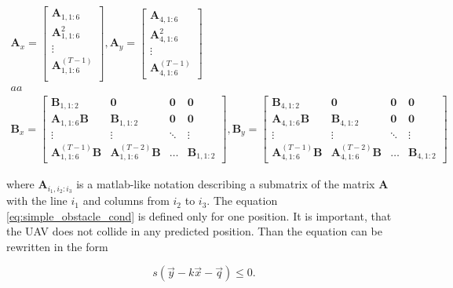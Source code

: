 \documentclass{article}
\begin{document}
\begin{equation}
\begin{split}
\textbf{A}_x = 
\begin{bmatrix}
\textbf{A}_{1, 1:6} \\
\textbf{A}^2_{1, 1:6} \\
\vdots \\
\textbf{A}^{(T-1)}_{1, 1:6} \\
\end{bmatrix}, 
\textbf{A}_y = 
\begin{bmatrix}
\textbf{A}_{4, 1:6} \\
\textbf{A}^2_{4, 1:6} \\
\vdots \\
\textbf{A}^{(T-1)}_{4, 1:6}
\end{bmatrix}\\
aa\\
\textbf{B}_x = 
\begin{bmatrix}
\textbf{B}_{1, 1:2} & \textbf{0} & \textbf{0} & \textbf{0} \\
\textbf{A}_{1, 1:6}\textbf{B} & \textbf{B}_{1, 1:2} & \textbf{0} & \textbf{0} \\
\vdots & \vdots & \ddots & \vdots \\
\textbf{A}^{(T-1)}_{1, 1:6}\textbf{B} & \textbf{A}^{(T-2)}_{1, 1:6}\textbf{B} & \hdots & \textbf{B}_{1, 1:2}
\end{bmatrix}
,
\textbf{B}_y = 
\begin{bmatrix}
\textbf{B}_{4, 1:2} & \textbf{0} & \textbf{0} & \textbf{0} \\
\textbf{A}_{4, 1:6}\textbf{B} & \textbf{B}_{4, 1:2} & \textbf{0} & \textbf{0} \\
\vdots & \vdots & \ddots & \vdots \\
\textbf{A}^{(T-1)}_{4, 1:6}\textbf{B} & \textbf{A}^{(T-2)}_{4, 1:6}\textbf{B} & \hdots & \textbf{B}_{4, 1:2}
\end{bmatrix}
\end{split}
\end{equation}

where $\textbf{A}_{i_1, i_2:i_3}$ is a matlab-like notation describing a submatrix of the matrix $\textbf{A}$ with the line $i_1$ and columns from $i_2$ to $i_3$. The equation \ref{eq:simple_obstacle_cond} is defined only for one position. It is important, that the UAV does not collide in any predicted position. Than the equation can be rewritten in the form 

\begin{equation}
\label{eq:vector_obstacle_cond}
s(\vec{y} - k\vec{x} - \vec{q}) \leq 0.
\end{equation}
\end{document}
